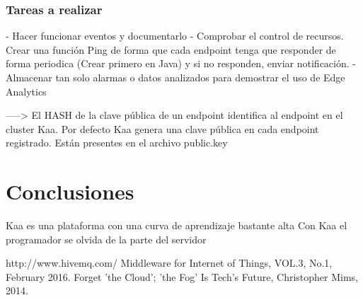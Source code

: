 \documentclass[12pt, twoside]{book}
\begin{document}
\subsubsection*{Tareas a realizar}
- Hacer funcionar eventos y documentarlo
- Comprobar el control de recursos. Crear una función Ping de forma que cada endpoint tenga que responder de forma periodica (Crear primero en Java) y si no responden, enviar notificación. 
- Almacenar tan solo alarmas o datos analizados para demostrar el uso de Edge Analytics


-----> El HASH de la clave pública de un endpoint identifica al endpoint en el cluster Kaa. Por defecto Kaa genera una clave pública en cada endpoint registrado. Están presentes en el archivo public.key
\section{Conclusiones}
Kaa es una plataforma con una curva de aprendizaje bastante alta
Con Kaa el programador se olvida de la parte del servidor
\begin{thebibliography}{X}
 {http://www.hivemq.com/}
 {Middleware for Internet of Things, VOL.3, No.1, February 2016.}
 {Forget 'the Cloud'; 'the Fog' Is Tech's Future, Christopher Mims, 2014.}
\end{thebibliography}
\end{document}

